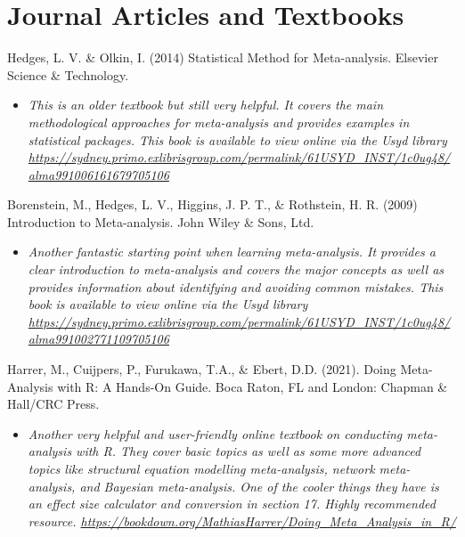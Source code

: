 \documentclass[
]{book}
\providecommand{\tightlist}{%
  \setlength{\itemsep}{0pt}\setlength{\parskip}{0pt}}
\begin{document}
\section{Journal Articles and Textbooks}\label{journal-articles-and-textbooks-4}

Hedges, L. V. \& Olkin, I. (2014) Statistical Method for Meta-analysis. Elsevier Science \& Technology.

\begin{itemize}
\tightlist
\item
  \emph{This is an older textbook but still very helpful. It covers the main methodological approaches for meta-analysis and provides examples in statistical packages. This book is available to view online via the Usyd library \url{https://sydney.primo.exlibrisgroup.com/permalink/61USYD_INST/1c0ug48/alma991006161679705106} }
\end{itemize}

Borenstein, M., Hedges, L. V., Higgins, J. P. T., \& Rothstein, H. R. (2009) Introduction to Meta-analysis. John Wiley \& Sons, Ltd.~

\begin{itemize}
\tightlist
\item
  \emph{Another fantastic starting point when learning meta-analysis. It provides a clear introduction to meta-analysis and covers the major concepts as well as provides information about identifying and avoiding common mistakes. This book is available to view online via the Usyd library \url{https://sydney.primo.exlibrisgroup.com/permalink/61USYD_INST/1c0ug48/alma991002771109705106} }
\end{itemize}

Harrer, M., Cuijpers, P., Furukawa, T.A., \& Ebert, D.D. (2021). Doing Meta-Analysis with R: A Hands-On Guide. Boca Raton, FL and London: Chapman \& Hall/CRC Press.

\begin{itemize}
\tightlist
\item
  \emph{Another very helpful and user-friendly online textbook on conducting meta-analysis with R. They cover basic topics as well as some more advanced topics like structural equation modelling meta-analysis, network meta-analysis, and Bayesian meta-analysis. One of the cooler things they have is an effect size calculator and conversion in section 17. Highly recommended resource. \url{https://bookdown.org/MathiasHarrer/Doing_Meta_Analysis_in_R/} }
\end{itemize}
\end{document}
